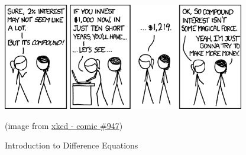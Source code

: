 %
%


\begin{topic}


%
%
%	

\vfil

\begin{center}
\begin{minipage}{300pt}
	\includegraphics*[width=300pt]{images/chap5-xkcd.png}

	\hfill {\footnotesize (image from \href{https://www.xkcd.com/947/}{xkcd - comic \#947})}
\end{minipage}
\end{center}
\end{topic}











%
%



\begin{module}{Introduction to Difference Equations}
	\label{diff:intro}

	
	
\end{module}



